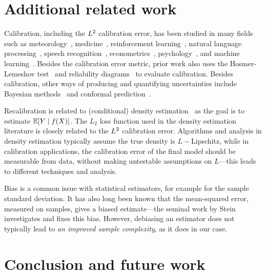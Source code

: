 \section{Additional related work}

Calibration, including the $L^2$ calibration error, has been studied in many fields such as meteorology~\cite{murphy1973vector, murphy1977reliability, degroot1983forecasters,gneiting2005weather, brocker2009decomposition}, medicine~\cite{jiang2012calibrating, crowson2017calibration, harrell1996prognostic}, reinforcement learning~\cite{malik2019calibrated}, natural language processing~\cite{nguyen2015posterior, card2018calibration}, speech recognition~\cite{dong2011calibration}, econometrics~\cite{gneiting2007probabilistic}, psychology~\cite{lichtenstein1982calibration}, and machine learning~\cite{guo2017calibration, zadrozny2001calibrated, kuleshov2018accurate, zadrozny2002transforming, naeini2014binary, hendrycks2019anomaly, hendrycks2019pretraining}. Besides the calibration error metric, prior work also uses the Hosmer-Lemeshov test~\cite{hosmer1980goodness} and reliability diagrams~\cite{degroot1983forecasters, brocker2007reliability} to evaluate calibration. Besides calibration, other ways of producing and quantifying uncertainties include Bayesian methods~\cite{gelman1995bayesian} and conformal prediction~\cite{shafer2008tutorial, lei2016distribution}.

Recalibration is related to (conditional) density estimation~\cite{wasserman2019, parzen1962} as the goal is to estimate $\mathbb{E}[Y \mid f(X)]$. The $L_2$ loss function used in the density estimation literature is closely related to the $L^2$ calibration error. Algorithms and analysis in density estimation typically assume the true density is $L-$Lipschitz, while in calibration applications, the calibration error of the final model should be measurable from data, without making untestable assumptions on $L$---this leads to different techniques and analysis.


Bias is a common issue with statistical estimators, for example for the sample standard deviation. It has also long been known that the mean-squared error, measured on samples, gives a biased estimate---the seminal work by Stein~\cite{stein81sure} investigates and fixes this bias. However, debiasing an estimator does not typically lead to \emph{an improved sample complexity}, as it does in our case.

\section{Conclusion and future work}

